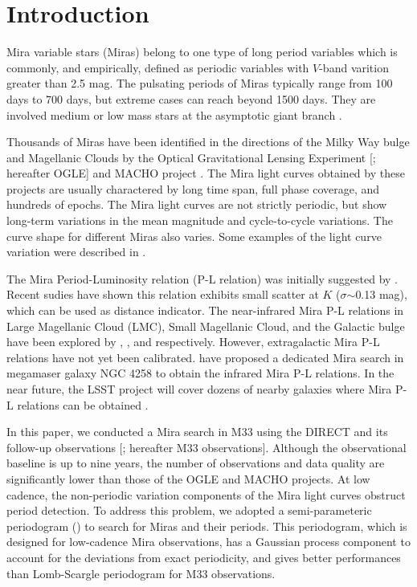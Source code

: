\section{Introduction}

Mira variable stars (Miras) belong to one type of long period variables which is commonly, and empirically, defined as periodic variables with $V$-band varition greater than 2.5 mag. The pulsating periods of Miras typically range from 100 days to 700 days, but extreme cases can reach beyond 1500 days. They are involved medium or low mass stars at the asymptotic giant branch \citep{2009asrp.proc...48F}. 

Thousands of Miras have been identified in the directions of the Milky Way bulge and Magellanic Clouds by the Optical Gravitational Lensing Experiment [\cite{1992AcA....42..253U}; hereafter OGLE] and MACHO project \citep{1993ASPC...43..291A}. The Mira light curves obtained by these projects are usually charactered by long time span, full phase coverage, and hundreds of epochs. The Mira light curves are not strictly periodic, but show long-term variations in the mean magnitude and cycle-to-cycle variations. The curve shape for different Miras also varies. Some examples of the light curve variation were described in \cite{2012OEJV..149....1H}.

The Mira Period-Luminosity relation (P-L relation) was initially suggested by \cite{1928PNAS...14..963G}. Recent sudies \citep{2003MNRAS.343...67G} have shown this relation exhibits small scatter at $K$ ($\sigma$$\sim$0.13 mag), which can be used as distance indicator. The near-infrared Mira P-L relations in Large Magellanic Cloud (LMC), Small Magellanic Cloud, and the Galactic bulge have been explored by \cite{2009AcA....59..239S}, \cite{2011AcA....61..217S}, and \cite{2013AcA....63...21S} respectively. However, extragalactic Mira P-L relations have not yet been calibrated. \cite{2013hst..prop13445B} have proposed a dedicated Mira search in megamaser galaxy NGC 4258 to obtain the infrared Mira P-L relations. In the near future, the LSST project will cover dozens of nearby galaxies where Mira P-L relations can be obtained \citep{2009arXiv0912.0201L}.

In this paper, we conducted a Mira search in M33 using the DIRECT and its follow-up observations [\cite{1998AJ....115.1016K,2011ApJS..193...26P}; hereafter M33 observations]. Although the observational baseline is up to nine years, the number of observations and data quality are significantly lower than those of the OGLE and MACHO projects. At low cadence, the non-periodic variation components of the Mira light curves obstruct period detection. To address this problem, we adopted a semi-parameteric periodogram () to search for Miras and their periods. This periodogram, which is designed for low-cadence Mira observations, has a Gaussian process component to account for the deviations from exact periodicity, and gives better performances than Lomb-Scargle \citep{1976Ap&SS..39..447L,1982ApJ...263..835S} periodogram for M33 observations.


